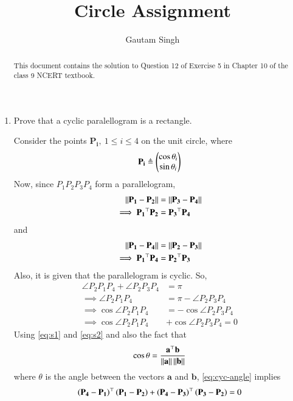 \documentclass[journal,12pt,twocolumn]{IEEEtran}
\renewcommand{\vec}[1]{\boldsymbol{\mathbf{#1}}}
\begin{document}
\vspace{3cm}
\title{Circle Assignment}
\author{Gautam Singh}
\maketitle
\bigskip

\begin{abstract}
    This document contains the solution to Question 12 of 
    Exercise 5 in Chapter 10 of the class 9 NCERT textbook.
\end{abstract}

\begin{enumerate}
    \item Prove that a cyclic paralellogram is a rectangle.

    \solution Consider the points $\vec{P_i},\ 1 \le i \le 4$ on the 
    unit circle, where
    \begin{align}
        \vec{P_i} \triangleq \myvec{\cos{\theta_i}\\\sin{\theta_i}}
        \label{eq:P-def}
    \end{align}
    Now, since $P_1P_2P_3P_4$ form a parallelogram,
    \begin{align}
        \norm{\vec{P_1}-\vec{P_2}} &= \norm{\vec{P_3}-\vec{P_4}} \label{eq:s1} \\
        \implies \vec{P_1}^\top\vec{P_2} &= \vec{P_3}^\top\vec{P_4}
        \label{eq:dot-prod-1}
    \end{align}
    and
    \begin{align}
        \norm{\vec{P_1}-\vec{P_4}} &= \norm{\vec{P_2}-\vec{P_3}} \label{eq:s2} \\
        \implies \vec{P_1}^\top\vec{P_4} &= \vec{P_2}^\top\vec{P_3}
        \label{eq:dot-prod-2}
    \end{align}
    Also, it is given that the parallelogram is cyclic. So,
    \begin{align}
        \angle{P_2P_1P_4} + \angle{P_2P_3P_4} &= \pi \\
        \implies \angle{P_2P_1P_4} &= \pi - \angle{P_2P_3P_4} \\
        \implies \cos\angle{P_2P_1P_4} &= -\cos\angle{P_2P_3P_4} \\
        \implies \cos\angle{P_2P_1P_4} &+ \cos\angle{P_2P_3P_4} = 0
        \label{eq:cyc-angle}
    \end{align}
    Using \eqref{eq:s1} and \eqref{eq:s2} and also the fact that
    \begin{align}
        \cos\theta = \frac{\vec{a}^\top\vec{b}}{\norm{\vec{a}}\norm{\vec{b}}}
        \label{eq:dot-prod-gen}
    \end{align}
    where $\theta$ is the angle between the vectors $\vec{a}$ and $\vec{b}$, 
    \eqref{eq:cyc-angle} implies
    \begin{align}
        \brak{\vec{P_4}-\vec{P_1}}^\top\brak{\vec{P_1}-\vec{P_2}} + \brak{\vec{P_4}-\vec{P_3}}^\top\brak{\vec{P_3}-\vec{P_2}} = 0
        \label{eq:cyclic}
    \end{align}


\end{enumerate}
\end{document}
